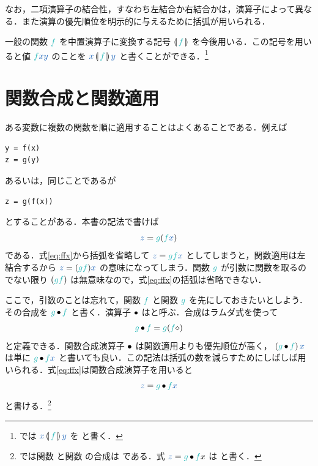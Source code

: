 \documentclass[a5paper,twoside,fleqn,draft]{jsbook}
\begin{document}
なお，二項演算子の結合性，すなわち左結合か右結合かは，演算子によって異なる．また演算の優先順位を明示的に与えるために括弧が用いられる．

\separator

一般の関数 $\hFunc{f}$ を中置演算子に変換する記号 $\hInfixWith{\hFunc{f}}$ を今後用いる．この記号を用いると値 $\hFunc{f}\hVar{x}\hVar{y}$ のことを $\hVar{x}\hInfixWith{\hFunc{f}}\hVar{y}$ と書くことができる．\footnote{\haskell では $\hVar{x}\hInfixWith{\hFunc{f}}\hVar{y}$ を  と書く．}

\section{関数合成と関数適用}

ある変数に複数の関数を順に適用することはよくあることである．例えば
\begin{pythoncode}
\begin{verbatim}
y = f(x)
z = g(y)
\end{verbatim}
\end{pythoncode}
あるいは，同じことであるが
\begin{pythoncode}
\begin{verbatim}
z = g(f(x))
\end{verbatim}
\end{pythoncode}
とすることがある．本書の記法で書けば
\begin{equation}
  \label{eq:ffx}
  \hVar{z}=
  \hFunc{g}(\hFunc{f}\hVar{x})
\end{equation}
である．式\eqref{eq:ffx}から括弧を省略して $\hVar{z}=\hFunc{g}\hFunc{f}\hVar{x}$ としてしまうと，関数適用は左結合するから $\hVar{z}=(\hFunc{g}\hFunc{f})\hVar{x}$ の意味になってしまう．関数 $\hFunc{g}$ が引数に関数を取るのでない限り $(\hFunc{g}\hFunc{f})$ は無意味なので，式\eqref{eq:ffx}の括弧は省略できない．

ここで，引数のことは忘れて，関数 $\hFunc{f}$ と関数 $\hFunc{g}$ を先にしておきたいとしよう．その合成を $\hFunc{g}\hCompose\hFunc{f}$ と書く．演算子 $\operatorname{\bullet}$ はと呼ぶ．合成はラムダ式を使って
\begin{equation}
  \hFunc{g}\hCompose \hFunc{f}
  =\hFunc{g}(\hFunc{f}\hAnonParam)
\end{equation}
と定義できる．関数合成演算子 $\operatorname{\bullet}$ は関数適用よりも優先順位が高く， $\left(\hFunc{g}\hCompose \hFunc{f}\right)\hVar{x}$ は単に $\hFunc{g}\hCompose\hFunc{f}\hVar{x}$ と書いても良い．この記法は括弧の数を減らすためにしばしば用いられる．式\eqref{eq:ffx}は関数合成演算子を用いると
\begin{equation}
  \hVar{z}
  =\hFunc{g}\hCompose\hFunc{f}\hVar{x}
\end{equation}
と書ける．\footnote{\haskell では関数  と関数  の合成は  である．式 $\hVar{z}=\hFunc{g}\hCompose \hFunc{f} x$ は  と書く．}
\end{document}
